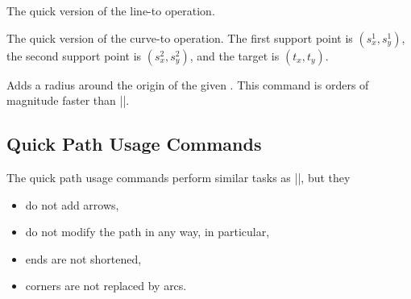 \begin{command}{\pgfpathqlineto{}}
  The quick version of the line-to operation.
\end{command}

\begin{command}{\pgfpathqcurveto{}}
  The quick version of the curve-to operation. The first support point
  is $(s^1_x,s^1_y)$, the second support point is  $(s^2_x,s^2_y)$,
  and the target is $(t_x,t_y)$.
 
\begin{codeexample}[]
\end{codeexample}
\end{command}

\begin{command}{\pgfpathqcircle{}}
  Adds a radius around the origin of the given . This
  command is orders of magnitude faster than
  ||. 
 
\begin{codeexample}[]
\end{codeexample}
\end{command}



\subsection{Quick Path Usage Commands}

The quick path usage commands perform similar tasks as |\pgfusepath|,
but they
\begin{itemize}
\item
  do not add arrows,
\item
  do not modify the path in any way, in particular,
\item
  ends are not shortened,
\item
  corners are not replaced by arcs.
\end{itemize}

